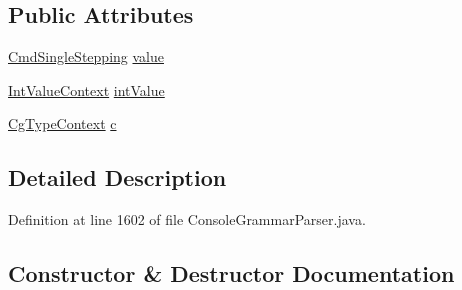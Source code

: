 \subsection*{Public Attributes}
\begin{DoxyCompactItemize}
\item 
\hyperlink{classgov_1_1nasa_1_1jpf_1_1inspector_1_1client_1_1commands_1_1_cmd_single_stepping}{Cmd\+Single\+Stepping} \hyperlink{classgov_1_1nasa_1_1jpf_1_1inspector_1_1client_1_1parser_1_1_console_grammar_parser_1_1_cmd_single_steps_context_a7585552ff228d1d3fa66164ae1879910}{value}
\item 
\hyperlink{classgov_1_1nasa_1_1jpf_1_1inspector_1_1client_1_1parser_1_1_console_grammar_parser_1_1_int_value_context}{Int\+Value\+Context} \hyperlink{classgov_1_1nasa_1_1jpf_1_1inspector_1_1client_1_1parser_1_1_console_grammar_parser_1_1_cmd_single_steps_context_a6d9c0d709339223f4a189533ce9ba93a}{int\+Value}
\item 
\hyperlink{classgov_1_1nasa_1_1jpf_1_1inspector_1_1client_1_1parser_1_1_console_grammar_parser_1_1_cg_type_context}{Cg\+Type\+Context} \hyperlink{classgov_1_1nasa_1_1jpf_1_1inspector_1_1client_1_1parser_1_1_console_grammar_parser_1_1_cmd_single_steps_context_af6f1fa6a545d472eb9e692313fd9bf07}{c}
\end{DoxyCompactItemize}


\subsection{Detailed Description}


Definition at line 1602 of file Console\+Grammar\+Parser.\+java.



\subsection{Constructor \& Destructor Documentation}
